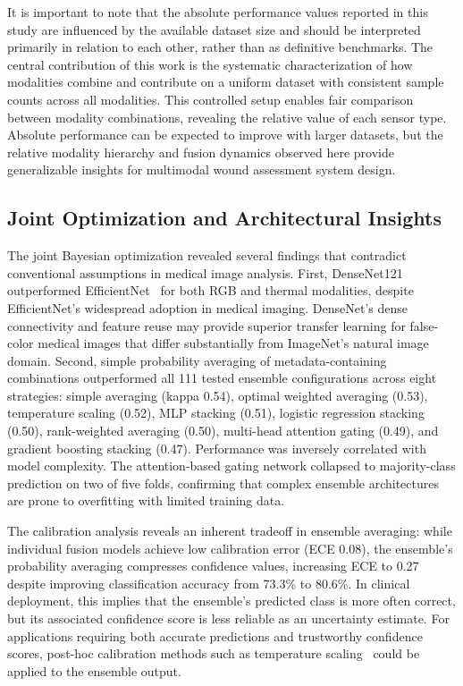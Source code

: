 \documentclass[journal,twoside,web]{ieeecolor}
\begin{document}
It is important to note that the absolute performance values reported in this study are influenced by the available dataset size and should be interpreted primarily in relation to each other, rather than as definitive benchmarks. The central contribution of this work is the systematic characterization of how modalities combine and contribute on a uniform dataset with consistent sample counts across all modalities. This controlled setup enables fair comparison between modality combinations, revealing the relative value of each sensor type. Absolute performance can be expected to improve with larger datasets, but the relative modality hierarchy and fusion dynamics observed here provide generalizable insights for multimodal wound assessment system design.

\subsection{Joint Optimization and Architectural Insights}
The joint Bayesian optimization revealed several findings that contradict conventional assumptions in medical image analysis. First, DenseNet121~\cite{huang2017densely} outperformed EfficientNet~\cite{tan2019efficientnet} for both RGB and thermal modalities, despite EfficientNet's widespread adoption in medical imaging. DenseNet's dense connectivity and feature reuse may provide superior transfer learning for false\nobreakdash-color medical images that differ substantially from ImageNet's natural image domain. Second, simple probability averaging of metadata\nobreakdash-containing combinations outperformed all 111 tested ensemble configurations across eight strategies: simple averaging (kappa 0.54), optimal weighted averaging (0.53), temperature scaling (0.52), MLP stacking (0.51), logistic regression stacking (0.50), rank\nobreakdash-weighted averaging (0.50), multi\nobreakdash-head attention gating (0.49), and gradient boosting stacking (0.47). Performance was inversely correlated with model complexity. The attention\nobreakdash-based gating network collapsed to majority\nobreakdash-class prediction on two of five folds, confirming that complex ensemble architectures are prone to overfitting with limited training data.

The calibration analysis reveals an inherent tradeoff in ensemble averaging: while individual fusion models achieve low calibration error (ECE 0.08), the ensemble's probability averaging compresses confidence values, increasing ECE to 0.27 despite improving classification accuracy from 73.3\% to 80.6\%. In clinical deployment, this implies that the ensemble's predicted class is more often correct, but its associated confidence score is less reliable as an uncertainty estimate. For applications requiring both accurate predictions and trustworthy confidence scores, post\nobreakdash-hoc calibration methods such as temperature scaling~\cite{guo2017calibration} could be applied to the ensemble output.
\end{document}

